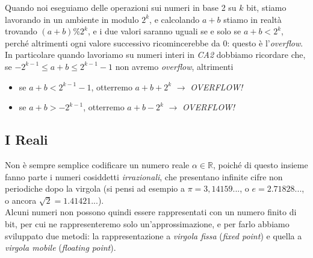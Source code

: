 \documentclass[class=book, crop=false]{standalone}
\begin{document}
Quando noi eseguiamo delle operazioni sui numeri in base 2 su $k$ bit, stiamo lavorando in un ambiente in modulo $2^{k}$, e calcolando $a+b$ stiamo in realtà trovando $(a+b)\%2^{k}$, e i due valori saranno uguali se e solo se $a+b<2^{k}$, perché altrimenti ogni valore successivo ricomincerebbe da 0: questo è l'\emph{overflow}.\\
In particolare quando lavoriamo su numeri interi in \emph{CA2} dobbiamo ricordare che, se $-2^{k-1}\le a+b\le 2^{k-1}-1$ non avremo \emph{overflow}, altrimenti
\begin{itemize}[noitemsep,nolistsep]
	\item se $a+b<2^{k-1}-1$, otterremo $a+b+2^{k}$ $\longrightarrow$ \emph{OVERFLOW!}
	\item se $a+b>-2^{k-1}$, otterremo $a+b-2^{k}$ $\longrightarrow$ \emph{OVERFLOW!}
\end{itemize}

\subsection{I Reali} Non è sempre semplice codificare un numero reale $\alpha \in \mathbb{R}$, poiché di questo insieme fanno parte i numeri cosiddetti \emph{irrazionali}, che presentano infinite cifre non periodiche dopo la virgola (si pensi ad esempio a $\pi=3,14159...$, o $e=2.71828...$, o ancora $\sqrt{2}=1.41421...$).\\
Alcuni numeri non possono quindi essere rappresentati con un numero finito di bit, per cui ne rappresenteremo solo un'approssimazione, e per farlo abbiamo sviluppato due metodi: la rappresentazione a \emph{virgola fissa} (\emph{fixed point}) e quella a \emph{virgola mobile} (\emph{floating point}).
\end{document}
